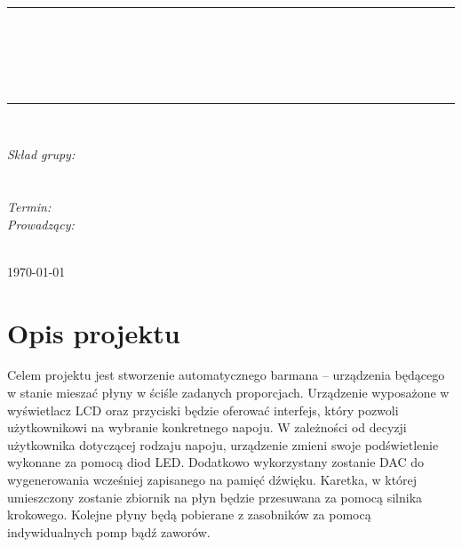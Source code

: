 \documentclass[10pt, a4paper]{article}
\begin{document}
\def\tablename{Tabela}	%

\begin{titlepage}
	\begin{center}
		\textsc{\LARGE \formakursu}\\[1cm]		
		\textsc{\Large \kurs}\\[0.5cm]		
		\rule{\textwidth}{0.08cm}\\[0.4cm]
		{\huge \bfseries \doctype}\\[1cm]
		{\huge \bfseries \projectname}\\[0.5cm]
		{\huge \bfseries \acronim}\\[0.4cm]
		\rule{\textwidth}{0.08cm}\\[1cm]
		
		\begin{flushright} \large
		\emph{Skład grupy:}\\
		\osobaA\\
		\osobaB\\[0.4cm]
		
		\emph{Termin: }\termin\\[0.4cm]

		\emph{Prowadzący:} \\
		\prowadzacy \\
		
		\end{flushright}
		
		\vfill
		
		{\large \today}
	\end{center}	
\end{titlepage}

\newpage
\tableofcontents
\newpage

\section{Opis projektu}
\label{sec:OpisProjektu}

Celem projektu jest stworzenie automatycznego barmana -- urządzenia będącego w stanie mieszać płyny w ściśle zadanych proporcjach. Urządzenie wyposażone w wyświetlacz LCD oraz przyciski będzie oferować interfejs, który pozwoli użytkownikowi na wybranie konkretnego napoju. W zależności od decyzji użytkownika dotyczącej rodzaju napoju, urządzenie zmieni swoje podświetlenie wykonane za pomocą diod LED. Dodatkowo wykorzystany zostanie DAC do wygenerowania wcześniej zapisanego na pamięć dźwięku. Karetka, w której umieszczony zostanie zbiornik na płyn będzie przesuwana za pomocą silnika krokowego. Kolejne płyny będą pobierane z zasobników za pomocą indywidualnych pomp bądź zaworów.
\end{document}
